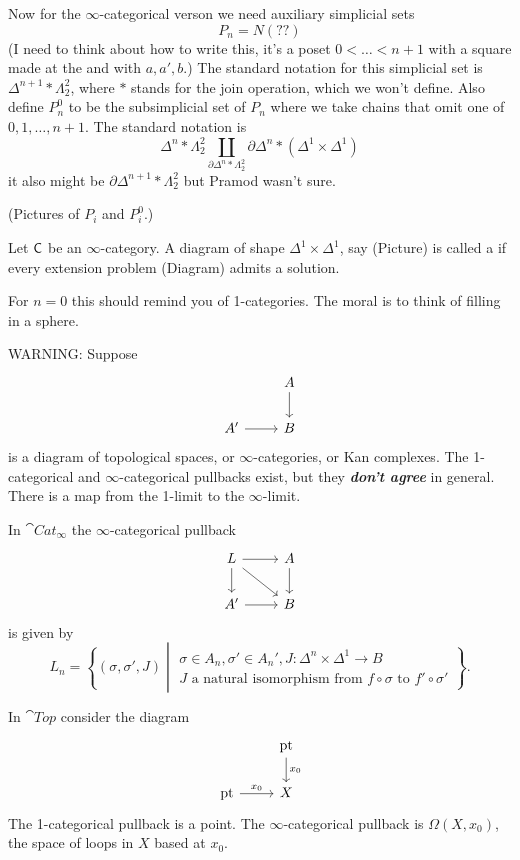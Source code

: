 Now for the $\infty$-categorical verson we need auxiliary simplicial sets
\[
P_n = N(??)
\] 
(I need to think about how to write this, it's a poset $0< \dots< n+1$ with a square made at the and with $a,a',b$.) The standard notation for this simplicial set is $\Delta^{n+1}*\Lambda_2^2$, where $*$ stands for the join operation, which we won't define. Also define $P_n^{0}$ to be the subsimplicial set of $P_n$ where we take chains that omit one of $0,1,\dots,n+1$. The standard notation is
\[
\Delta^{n} * \Lambda^2_2 \coprod_{\partial\Delta^{n}*\Lambda_2^2}\partial\Delta^{n} * (\Delta^{1}\times \Delta^{1})
\] 
it also might be $\partial \Delta^{n+1}*\Lambda_2^2$ but Pramod wasn't sure.

(Pictures of $P_i$ and $P_i^{0}$.)

\begin{definition}
	Let $\mathsf{C}$ be an $\infty$-category. A diagram of shape $\Delta^{1}\times \Delta^{1}$, say (Picture) is called a  if every extension problem (Diagram) admits a solution.
\end{definition}
For $n=0$ this should remind you of 1-categories. The moral is to think of filling in a sphere.

WARNING: Suppose
\[
\begin{tikzcd}
	& A \ar[d] \\
	A' \ar[r] & B
\end{tikzcd}
\] 
is a diagram of topological spaces, or $\infty$-categories, or Kan complexes. The 1-categorical and $\infty$-categorical pullbacks exist, but they \textbf{\emph{don't agree}} in general. There is a map from the 1-limit to the $\infty$-limit.

In $\cat{Cat}_\infty$ the $\infty$-categorical pullback
\[
\begin{tikzcd}
	L \ar[r] \ar[d] \ar[dr] & A \ar[d] \\ A' \ar[r] & B
\end{tikzcd}
\] 
is given by
\[
	L_n = \left\{ (\sigma,\sigma',J) \middle| \begin{array}{c}
		\sigma\in A_n, \sigma'\in A_n', J:\Delta^{n}\times \Delta^{1}\to B \\
		J\text{ a natural isomorphism from }f\circ\sigma\text{ to }f'\circ\sigma'
	\end{array}\right\} .
\] 

In $\cat{Top}$ consider the diagram
\[
\begin{tikzcd}
	& \text{pt} \ar[d,"x_0"] \\
	\text{pt} \ar[r,"x_0"] & X
\end{tikzcd}
\] 
The 1-categorical pullback is a point. The $\infty$-categorical pullback is $\Omega(X,x_0)$, the space of loops in $X$ based at $x_0$.

